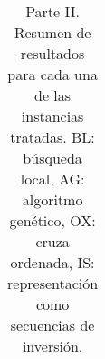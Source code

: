 \begin{table}[H]
{\begin{tabular}{c|cccccccc}
		\bottomrule
	\end{tabular}
}
	\caption{Parte II. Resumen de resultados para cada una de las instancias tratadas. BL: búsqueda local, AG: algoritmo genético, OX: cruza ordenada, IS: representación como secuencias de inversión.}
	\label{results2}

\end{table}

